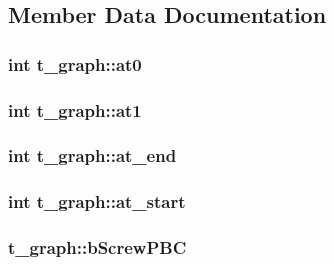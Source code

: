 \subsection{\-Member \-Data \-Documentation}
\hypertarget{structt__graph_a1daee31cfb69cc647d4d812d72df0027}{
\subsubsection[{at0}]{\setlength{\rightskip}{0pt plus 5cm}int {\bf t\-\_\-graph\-::at0}}}\label{structt__graph_a1daee31cfb69cc647d4d812d72df0027}
\hypertarget{structt__graph_ad79c215f314131f4da5a5991df7eb3b5}{
\subsubsection[{at1}]{\setlength{\rightskip}{0pt plus 5cm}int {\bf t\-\_\-graph\-::at1}}}\label{structt__graph_ad79c215f314131f4da5a5991df7eb3b5}
\hypertarget{structt__graph_a748ad189f6d9e20bae110f60eaa61ee3}{
\subsubsection[{at\-\_\-end}]{\setlength{\rightskip}{0pt plus 5cm}int {\bf t\-\_\-graph\-::at\-\_\-end}}}\label{structt__graph_a748ad189f6d9e20bae110f60eaa61ee3}
\hypertarget{structt__graph_ad435f8c158f6902075cf2812f5e8b2e3}{
\subsubsection[{at\-\_\-start}]{\setlength{\rightskip}{0pt plus 5cm}int {\bf t\-\_\-graph\-::at\-\_\-start}}}\label{structt__graph_ad435f8c158f6902075cf2812f5e8b2e3}
\hypertarget{structt__graph_a7a0a4986b0d0d3637a576a12ec0dc8d2}{
\subsubsection[{b\-Screw\-P\-B\-C}]{ {\bf t\-\_\-graph\-::b\-Screw\-P\-B\-C}}}\label{structt__graph_a7a0a4986b0d0d3637a576a12ec0dc8d2}
